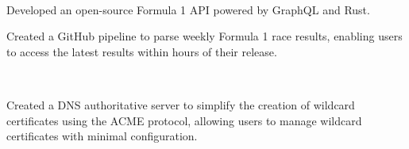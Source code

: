 \documentclass[a4paper]{MagicalCV}
\begin{document}
\begin{minipage}[t]{0.66\textwidth}

 \\
\begin{tightemize}
    \item Developed an open-source Formula 1 API powered by GraphQL and Rust.
    \item Created a GitHub pipeline to parse weekly Formula 1 race results, enabling users to access the latest results within hours of their release.
\end{tightemize}
\sectionsep

 \\
\begin{tightemize}
    \item Created a DNS authoritative server to simplify the creation of wildcard certificates using the ACME protocol, allowing users to manage wildcard certificates with minimal configuration.
\end{tightemize}
\sectionsep

\end{minipage}
\end{document}
